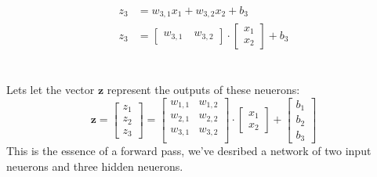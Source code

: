 \documentclass[9pt]{extarticle}
\theoremstyle{plain}
\theoremstyle{definition}
\theoremstyle{remark}
\begin{document}
\begin{minipage}{0.3\textwidth}
    \begin{center}

        \begin{align*}
            z_3 & = w_{3,1}x_1 + w_{3,2}x_2 + b_3                                                                           \\
            z_3 & = \begin{bmatrix} w_{3,1} \quad w_{3,2} \end{bmatrix}\cdot \begin{bmatrix} x_1 \\ x_2 \end{bmatrix} + b_3 \\
        \end{align*}
    \end{center}
\end{minipage} \\
Lets let the vector $\mathbf{z}$ represent the outputs of these neuerons:
$$
    \mathbf{z} =
    \begin{bmatrix}
        z_1 \\ z_2 \\ z_3
    \end{bmatrix}
    =
    \begin{bmatrix}
        w_{1,1} & w_{1,2} \\
        w_{2,1} & w_{2,2} \\
        w_{3,1} & w_{3,2} \\
    \end{bmatrix} \cdot \begin{bmatrix}
        x_1 \\ x_2
    \end{bmatrix} +
    \begin{bmatrix}
        b_1 \\ b_2 \\ b_3
    \end{bmatrix}
$$
This is the essence of a forward pass, we've desribed a network of two input neuerons and three hidden neuerons.
\end{document}
